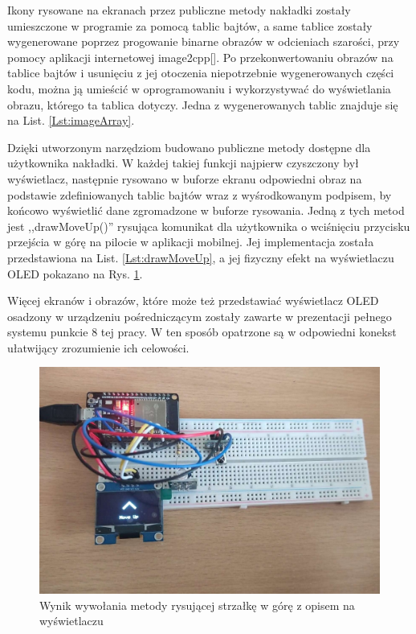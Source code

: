 \documentclass[12pt,twoside,draft]{article}
\begin{document}


Ikony rysowane na ekranach przez publiczne metody nakładki zostały umieszczone w programie za pomocą tablic bajtów, a same tablice zostały wygenerowane poprzez progowanie binarne obrazów w odcieniach szarości, przy pomocy aplikacji internetowej image2cpp[]. Po przekonwertowaniu obrazów na tablice bajtów i usunięciu z jej otoczenia niepotrzebnie wygenerowanych części kodu, można ją umieścić w oprogramowaniu i wykorzystywać do wyświetlania obrazu, którego ta tablica dotyczy. Jedna z wygenerowanych tablic znajduje się na List. \ref*{Lst:imageArray}.



Dzięki utworzonym narzędziom budowano publiczne metody dostępne dla użytkownika nakładki. W każdej takiej funkcji najpierw czyszczony był wyświetlacz, następnie rysowano w buforze ekranu odpowiedni obraz na podstawie zdefiniowanych tablic bajtów wraz z wyśrodkowanym podpisem, by końcowo wyświetlić dane zgromadzone w buforze rysowania. Jedną z tych metod jest ,,drawMoveUp()'' rysująca komunikat dla użytkownika o wciśnięciu przycisku przejścia w górę na pilocie w aplikacji mobilnej. Jej implementacja została przedstawiona na List. \ref*{Lst:drawMoveUp}, a jej fizyczny efekt na wyświetlaczu OLED pokazano na Rys. \ref*{Fig:drawMoveUp}.



Więcej ekranów i obrazów, które może też przedstawiać wyświetlacz OLED osadzony w urządzeniu pośredniczącym zostały zawarte w prezentacji pełnego systemu punkcie 8 tej pracy. W ten sposób opatrzone są w odpowiedni konekst ułatwijący zrozumienie ich celowości.

\begin{figure}[ht]
   \centering
   \includegraphics[width=14cm]{images/drawMoveUp.jpg}
   \caption{Wynik wywołania metody rysującej strzałkę w górę z opisem na wyświetlaczu}
   \label{Fig:drawMoveUp}
\end{figure}
\end{document}
